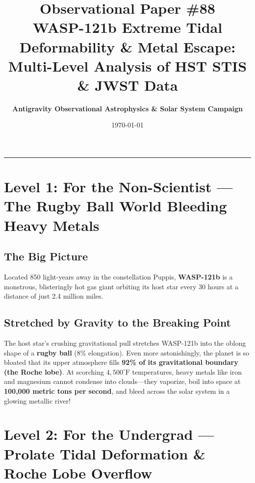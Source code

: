 \documentclass[11pt,a4paper]{article}
\title{\Huge \textbf{Observational Paper \#88}\\ \Large WASP-121b Extreme Tidal Deformability \& Metal Escape: Multi-Level Analysis of HST STIS \& JWST Data}
\author{\textbf{Antigravity Observational Astrophysics \& Solar System Campaign}}
\date{\today}
\begin{document}
\maketitle

\vspace{-1em}
\begin{center}
\rule{\textwidth}{1.5pt}
\end{center}

\section*{Level 1: For the Non-Scientist — The Rugby Ball World Bleeding Heavy Metals}

\subsection*{The Big Picture}
Located 850 light-years away in the constellation Puppis, \textbf{WASP-121b} is a monstrous, blisteringly hot gas giant orbiting its host star every 30 hours at a distance of just 2.4 million miles.

\subsection*{Stretched by Gravity to the Breaking Point}
The host star's crushing gravitational pull stretches WASP-121b into the oblong shape of a \textbf{rugby ball} ($8\%$ elongation). Even more astonishingly, the planet is so bloated that its upper atmosphere fills \textbf{92\% of its gravitational boundary (the Roche lobe)}. At scorching $4{,}500^\circ\text{F}$ temperatures, heavy metals like iron and magnesium cannot condense into clouds—they vaporize, boil into space at \textbf{100,000 metric tons per second}, and bleed across the solar system in a glowing metallic river!

\newpage

\section*{Level 2: For the Undergrad — Prolate Tidal Deformation \& Roche Lobe Overflow}
\end{document}
